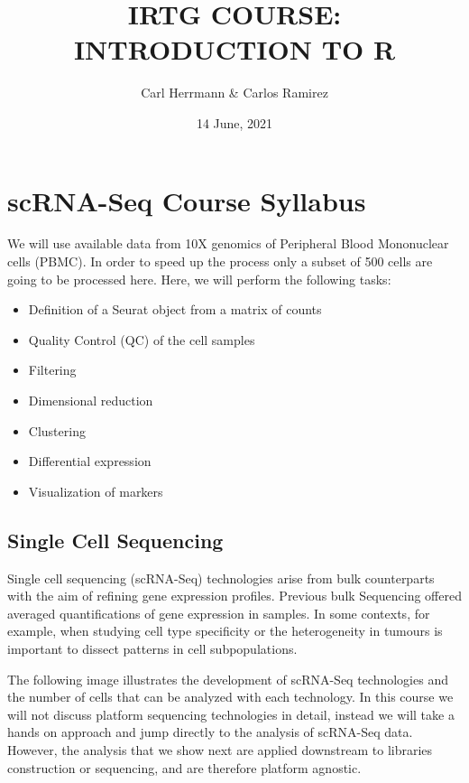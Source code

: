 \documentclass[
]{book}
\title{IRTG COURSE: INTRODUCTION TO R}
\author{Carl Herrmann \& Carlos Ramirez}
\date{14 June, 2021}
\providecommand{\tightlist}{%
  \setlength{\itemsep}{0pt}\setlength{\parskip}{0pt}}
\begin{document}
\maketitle

{
\setcounter{tocdepth}{1}
\tableofcontents
}
\hypertarget{intro}{%
\chapter{scRNA-Seq Course Syllabus}\label{intro}}

We will use available data from 10X genomics of Peripheral Blood Mononuclear cells (PBMC). In order
to speed up the process only a subset of 500 cells are going to be processed here. Here, we will
perform the following tasks:

\begin{itemize}
\tightlist
\item
  Definition of a Seurat object from a matrix of counts
\item
  Quality Control (QC) of the cell samples
\item
  Filtering
\item
  Dimensional reduction
\item
  Clustering
\item
  Differential expression
\item
  Visualization of markers
\end{itemize}

\hypertarget{single-cell-sequencing}{%
\section{Single Cell Sequencing}\label{single-cell-sequencing}}

Single cell sequencing (scRNA-Seq) technologies arise from bulk counterparts with
the aim of refining gene expression profiles. Previous bulk Sequencing offered
averaged quantifications of gene expression in samples. In some contexts, for
example, when studying cell type specificity or the heterogeneity in tumours is
important to dissect patterns in cell subpopulations.

The following image illustrates the development of scRNA-Seq technologies
and the number of cells that can be analyzed with each technology. In this
course we will not discuss platform sequencing technologies in detail,
instead we will take a hands on approach and jump directly to the analysis
of scRNA-Seq data. However, the analysis that we show next are applied downstream
to libraries construction or sequencing, and are therefore platform agnostic.
\end{document}
